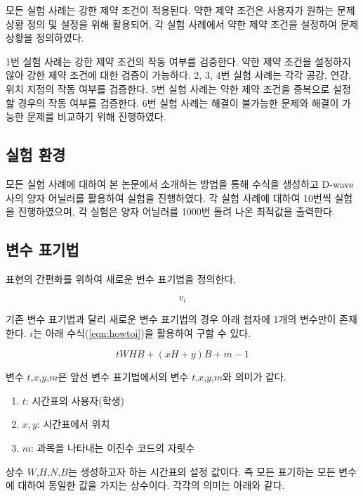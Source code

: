 \documentclass{article}
\begin{document}
모든 실험 사례는 강한 제약 조건이 적용된다. 약한 제약 조건은 사용자가 원하는 문제 상황 정의 및 설정을 위해 활용되어, 각 실험 사례에서 약한 제약 조건을 설정하여 문제 상황을 정의하였다.

1번 실험 사례는 강한 제약 조건의 작동 여부를 검증한다. 약한 제약 조건을 설정하지 않아 강한 제약 조건에 대한 검증이 가능하다. 2, 3, 4번 실험 사례는 각각 공강, 연강, 위치 지정의 작동 여부를 검증한다. 5번 실험 사례는 약한 제약 조건을 중복으로 설정할 경우의 작동 여부를 검증한다. 6번 실험 사례는 해결이 불가능한 문제와 해결이 가능한 문제를 비교하기 위해 진행하였다.

    \subsection{실험 환경}

모든 실험 사례에 대하여 본 논문에서 소개하는 방법을 통해 수식을 생성하고 D-wave사의 양자 어닐러를 활용하여 실험을 진행하였다. 각 실험 사례에 대하여 10번씩 실험을 진행하였으며, 각 실험은 양자 어닐러를 1000번 돌려 나온 최적값을 출력한다.

    \subsection{변수 표기법}

표현의 간편화를 위하여 새로운 변수 표기법을 정의한다.

    \begin{equation}\label{eqn:newvar}
        v_{i}
    \end{equation}

기존 변수 표기법과 달리 새로운 변수 표기법의 경우 아래 첨자에 1개의 변수만이 존재한다. $i$는 아래 수식(\ref{eqn:howtoi})을 활용하여 구할 수 있다.

    \begin{equation}\label{eqn:howtoi}
        tWHB+(xH+y)B+m-1
    \end{equation}

변수 $t$,$x$,$y$,$m$은 앞선 변수 표기법에서의 변수 $t$,$x$,$y$,$m$와 의미가 같다.

    \begin{enumerate}
        \item [] $t$: 시간표의 사용자(학생)
        \item [] $x,y$: 시간표에서 위치
        \item [] $m$: 과목을 나타내는 이진수 코드의 자릿수
    \end{enumerate}

상수 $W$,$H$,$N$,$B$는 생성하고자 하는 시간표의 설정 값이다. 즉 모든 표기하는 모든 변수에 대하여 동일한 값을 가지는 상수이다. 각각의 의미는 아래와 같다.
\end{document}
